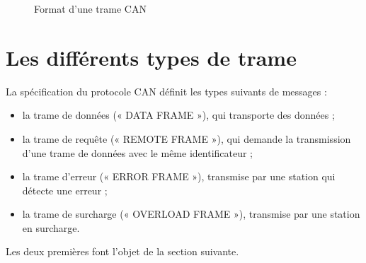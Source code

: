 \begin{figure}[h!]
  \caption{Format d'une trame CAN}
\end{figure}


\section{Les différents types de trame}

La spécification du protocole CAN définit les types suivants de messages :
\begin{itemize}
\item  la trame de données (« DATA FRAME »), qui transporte des données ;
\item  la trame de requête (« REMOTE FRAME »), qui demande la transmission d’une trame de données avec le même identificateur ;
\item  la trame d’erreur (« ERROR FRAME »), transmise par une station qui détecte une erreur ;
\item  la trame de surcharge (« OVERLOAD FRAME »), transmise par une station en surcharge.
\end{itemize}

Les deux premières font l'objet de la section suivante.






